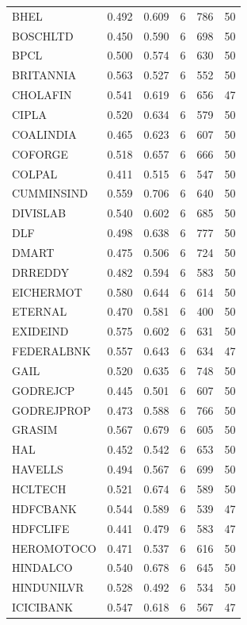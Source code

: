 \begin{small}
\begin{longtable}{l r r r r r}
BHEL        & 0.492 & 0.609 & 6 & 786 & 50 \\
BOSCHLTD    & 0.450 & 0.590 & 6 & 698 & 50 \\
BPCL        & 0.500 & 0.574 & 6 & 630 & 50 \\
BRITANNIA   & 0.563 & 0.527 & 6 & 552 & 50 \\
CHOLAFIN    & 0.541 & 0.619 & 6 & 656 & 47 \\
CIPLA       & 0.520 & 0.634 & 6 & 579 & 50 \\
COALINDIA   & 0.465 & 0.623 & 6 & 607 & 50 \\
COFORGE     & 0.518 & 0.657 & 6 & 666 & 50 \\
COLPAL      & 0.411 & 0.515 & 6 & 547 & 50 \\
CUMMINSIND  & 0.559 & 0.706 & 6 & 640 & 50 \\
DIVISLAB    & 0.540 & 0.602 & 6 & 685 & 50 \\
DLF         & 0.498 & 0.638 & 6 & 777 & 50 \\
DMART       & 0.475 & 0.506 & 6 & 724 & 50 \\
DRREDDY     & 0.482 & 0.594 & 6 & 583 & 50 \\
EICHERMOT   & 0.580 & 0.644 & 6 & 614 & 50 \\
ETERNAL     & 0.470 & 0.581 & 6 & 400 & 50 \\
EXIDEIND    & 0.575 & 0.602 & 6 & 631 & 50 \\
FEDERALBNK  & 0.557 & 0.643 & 6 & 634 & 47 \\
GAIL        & 0.520 & 0.635 & 6 & 748 & 50 \\
GODREJCP    & 0.445 & 0.501 & 6 & 607 & 50 \\
GODREJPROP  & 0.473 & 0.588 & 6 & 766 & 50 \\
GRASIM      & 0.567 & 0.679 & 6 & 605 & 50 \\
HAL         & 0.452 & 0.542 & 6 & 653 & 50 \\
HAVELLS     & 0.494 & 0.567 & 6 & 699 & 50 \\
HCLTECH     & 0.521 & 0.674 & 6 & 589 & 50 \\
HDFCBANK    & 0.544 & 0.589 & 6 & 539 & 47 \\
HDFCLIFE    & 0.441 & 0.479 & 6 & 583 & 47 \\
HEROMOTOCO  & 0.471 & 0.537 & 6 & 616 & 50 \\
HINDALCO    & 0.540 & 0.678 & 6 & 645 & 50 \\
HINDUNILVR  & 0.528 & 0.492 & 6 & 534 & 50 \\
ICICIBANK   & 0.547 & 0.618 & 6 & 567 & 47 \\

\end{longtable}
\end{small}

